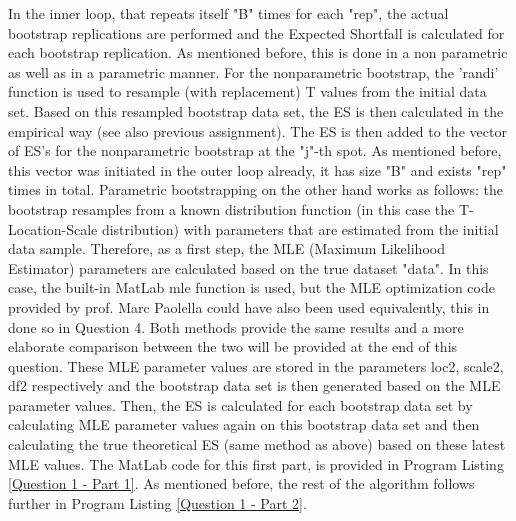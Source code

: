 \documentclass[12pt]{article}
\begin{document}
In the inner loop, that repeats itself "B" times for each "rep", the actual bootstrap replications are performed and the Expected Shortfall is calculated for each bootstrap replication. As mentioned before, this is done in a non parametric as well as in a parametric manner. \newline \newline
For the nonparametric bootstrap, the 'randi' function is used to resample (with replacement) T values from the initial data set. Based on this resampled bootstrap data set, the ES is then calculated in the empirical way (see also previous assignment). The ES is then added to the vector of ES's for the nonparametric bootstrap at the "j"-th spot. As mentioned before, this vector was initiated in the outer loop already, it has size "B" and exists "rep" times in total. \newline\newline Parametric bootstrapping on the other hand works as follows: the bootstrap resamples from a known distribution function (in this case the T-Location-Scale distribution) with parameters that are estimated from the initial data sample. Therefore, as a first step, the MLE (Maximum Likelihood Estimator) parameters are calculated based on the true dataset "data". In this case, the built-in MatLab mle function is used, but the MLE optimization code provided by prof. Marc Paolella could have also been used equivalently, this in done so in Question 4. Both methods provide the same results and a more elaborate comparison between the two will be provided at the end of this question. \newline These MLE parameter values are stored in the parameters loc2, scale2, df2 respectively and the bootstrap data set is then generated based on the MLE parameter values. Then, the ES is calculated for each bootstrap data set by calculating MLE parameter values again on this bootstrap data set and then calculating the true theoretical ES (same method as above) based on these latest MLE values. 
The MatLab code for this first part, is provided in Program Listing \ref{Question 1 - Part 1}. As mentioned before, the rest of the algorithm follows further in Program Listing \ref{Question 1 - Part 2}.
\end{document}
